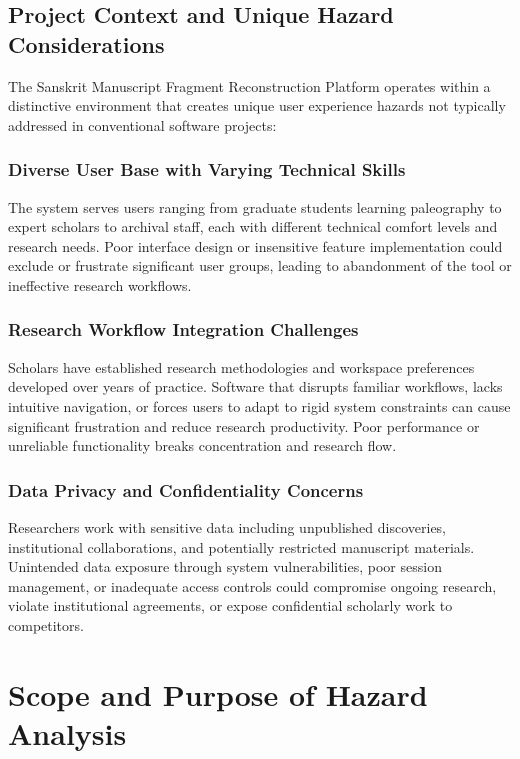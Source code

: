 \documentclass{article}
\begin{document}
\subsection{Project Context and Unique Hazard Considerations}

The Sanskrit Manuscript Fragment Reconstruction Platform operates within a distinctive environment that creates unique user experience hazards not typically addressed in conventional software projects:

\subsubsection{Diverse User Base with Varying Technical Skills}
The system serves users ranging from graduate students learning paleography to expert scholars to archival staff, each with different technical comfort levels and research needs. Poor interface design or insensitive feature implementation could exclude or frustrate significant user groups, leading to abandonment of the tool or ineffective research workflows.

\subsubsection{Research Workflow Integration Challenges}
Scholars have established research methodologies and workspace preferences developed over years of practice. Software that disrupts familiar workflows, lacks intuitive navigation, or forces users to adapt to rigid system constraints can cause significant frustration and reduce research productivity. Poor performance or unreliable functionality breaks concentration and research flow.

\subsubsection{Data Privacy and Confidentiality Concerns}
Researchers work with sensitive data including unpublished discoveries, institutional collaborations, and potentially restricted manuscript materials. Unintended data exposure through system vulnerabilities, poor session management, or inadequate access controls could compromise ongoing research, violate institutional agreements, or expose confidential scholarly work to competitors.


\section{Scope and Purpose of Hazard Analysis}
\end{document}
